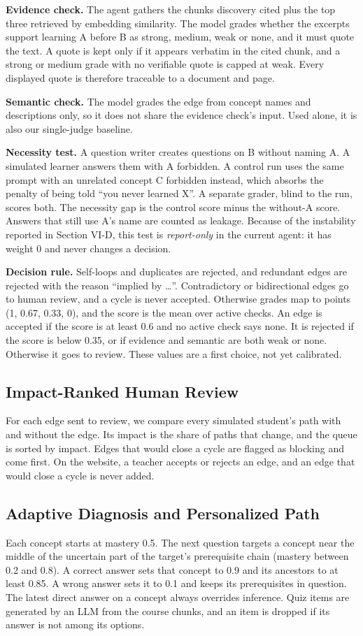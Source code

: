 \documentclass[conference]{IEEEtran}
\begin{document}
\textbf{Evidence check.} The agent gathers the chunks discovery cited plus the top three retrieved by embedding similarity. The model grades whether the excerpts support learning A before B as strong, medium, weak or none, and it must quote the text. A quote is kept only if it appears verbatim in the cited chunk, and a strong or medium grade with no verifiable quote is capped at weak. Every displayed quote is therefore traceable to a document and page.

\textbf{Semantic check.} The model grades the edge from concept names and descriptions only, so it does not share the evidence check's input. Used alone, it is also our single-judge baseline.

\textbf{Necessity test.} A question writer creates questions on B without naming A. A simulated learner answers them with A forbidden. A control run uses the same prompt with an unrelated concept C forbidden instead, which absorbs the penalty of being told ``you never learned X''. A separate grader, blind to the run, scores both. The necessity gap is the control score minus the without-A score. Answers that still use A's name are counted as leakage. Because of the instability reported in Section VI-D, this test is \emph{report-only} in the current agent: it has weight 0 and never changes a decision.

\textbf{Decision rule.} Self-loops and duplicates are rejected, and redundant edges are rejected with the reason ``implied by \ldots{}''. Contradictory or bidirectional edges go to human review, and a cycle is never accepted. Otherwise grades map to points (1, 0.67, 0.33, 0), and the score is the mean over active checks. An edge is accepted if the score is at least 0.6 and no active check says none. It is rejected if the score is below 0.35, or if evidence and semantic are both weak or none. Otherwise it goes to review. These values are a first choice, not yet calibrated.

\subsection{Impact-Ranked Human Review}
For each edge sent to review, we compare every simulated student's path with and without the edge. Its impact is the share of paths that change, and the queue is sorted by impact. Edges that would close a cycle are flagged as blocking and come first. On the website, a teacher accepts or rejects an edge, and an edge that would close a cycle is never added.

\subsection{Adaptive Diagnosis and Personalized Path}
Each concept starts at mastery 0.5. The next question targets a concept near the middle of the uncertain part of the target's prerequisite chain (mastery between 0.2 and 0.8). A correct answer sets that concept to 0.9 and its ancestors to at least 0.85. A wrong answer sets it to 0.1 and keeps its prerequisites in question. The latest direct answer on a concept always overrides inference. Quiz items are generated by an LLM from the course chunks, and an item is dropped if its answer is not among its options.
\end{document}
